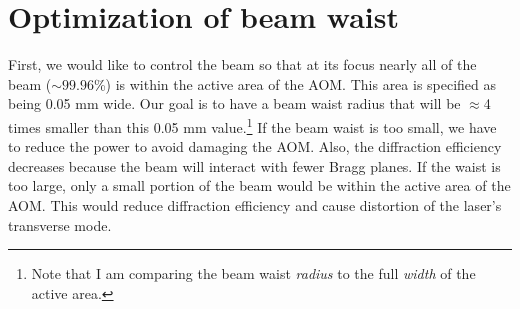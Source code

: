 \section{Optimization of beam waist}
First, we would like to control the beam so that at its focus nearly all of the beam ($\sim99.96$\%) is within the active area of the AOM.
This area is specified as being 0.05 mm wide. Our goal is to have a beam waist radius that will be $\approx$4 times smaller than this 0.05 mm value.\footnote{Note that I am comparing the beam waist \emph{radius} to the full \emph{width} of the active area.} %
If the beam waist is too small, we have to reduce the power to avoid damaging the AOM. Also, the diffraction efficiency decreases because the beam will interact with fewer Bragg planes. If the waist is too large, only a small portion of the beam would be within the active area of the AOM. This would reduce diffraction efficiency and cause distortion of the laser's transverse mode.

